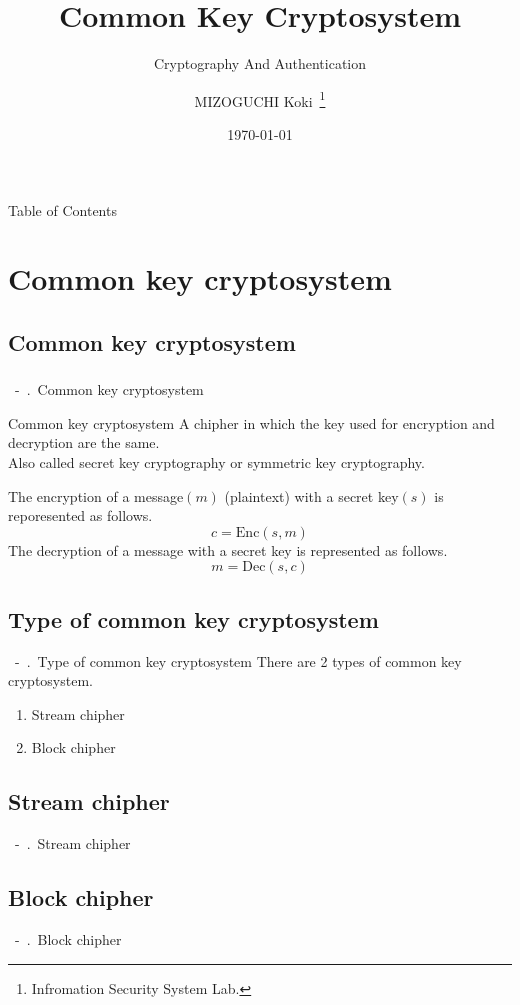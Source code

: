 \documentclass{beamer}
\title{Common Key Cryptosystem}
\subtitle{Cryptography And Authentication}
\author[K.MIZOGUCHI]{MIZOGUCHI Koki\ \thanks{Infromation Security System Lab.}}
\date{\today}
\institute[KUT]{Kochi University of Technology}
\newcommand{\shownum}{\thesection\ -\ \thesubsection.\ }
\begin{document}
\begin{frame}
    \titlepage
\end{frame}
\begin{frame}{Table of Contents}
    \tableofcontents
\end{frame}
\section{Common key cryptosystem}
\subsection{Common key cryptosystem}
\begin{frame}
    \frametitle{}
    \tableofcontents[currentsection,sectionstyle=show/shaded,subsectionstyle=shaded/shaded]
\end{frame}
\begin{frame}{\shownum Common key cryptosystem}
    \begin{exampleblock}{Common key cryptosystem}
        A chipher in which the key used for encryption and decryption are the same.\\
        Also called  secret key cryptography or symmetric key cryptography.
    \end{exampleblock}
    \begin{alertblock}{}
        The encryption of a message\((m)\) (plaintext) with a secret key\((s)\) is reporesented as follows.
        \[c=\mathrm{Enc}(s,m)\]
        The decryption of a message with a secret key is represented as follows.
        \[m=\mathrm{Dec}(s,c)\]
    \end{alertblock}
\end{frame}
\subsection{Type of common key cryptosystem}
\begin{frame}{\shownum Type of common key cryptosystem}
    There are 2 types of common key cryptosystem.
    \begin{block}{}
        \begin{enumerate}
            \setlength{\itemsep}{1em}
            \item Stream chipher
            \item Block chipher
        \end{enumerate}
    \end{block}
\end{frame}
\subsection{Stream chipher}
\begin{frame}{\shownum Stream chipher}

\end{frame}
\subsection{Block chipher}
\begin{frame}{\shownum Block chipher}

\end{frame}
\end{document}
